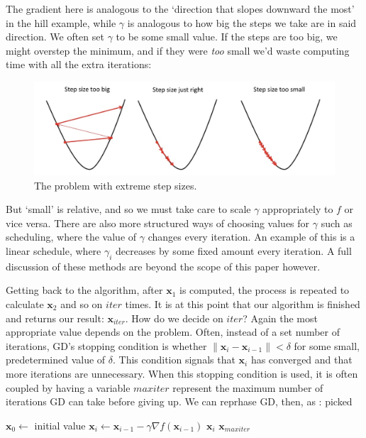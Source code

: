\documentclass{article}
\renewcommand\vec{\mathbf}
\begin{document}
  The gradient here is analogous to the `direction that slopes downward the most' in the hill example, while $\gamma$ is analogous to how big the steps we take are in said direction. We often set $\gamma$ to be some small value. If the steps are too big, we might overstep the minimum, and if they were \textit{too} small we'd waste computing time with all the extra iterations:

  \begin{figure}[H]
    \centering
    \includegraphics[scale=.3]{stepsize}
    \caption{The problem with extreme step sizes.}
  \end{figure}

  But `small' is relative, and so we must take care to scale $\gamma$ appropriately to $f$ or vice versa. There are also more structured ways of choosing values for $\gamma$ such as scheduling, where the value of $\gamma$ changes every iteration. An example of this is a linear schedule, where $\gamma_i$ decreases by some fixed amount every iteration. A full discussion of these methods are beyond the scope of this paper however.

  Getting back to the algorithm, after $\vec x_1$ is computed, the process is repeated to calculate $\vec x_2$ and so on $iter$ times. It is at this point that our algorithm is finished and returns our result: $\vec x_{iter}$. How do we decide on $iter$? Again the most appropriate value depends on the problem. Often, instead of a set number of iterations, GD's stopping condition is whether $\|\vec x_i-\vec x_{i-1}\|<\delta$ for some small, predetermined value of $\delta$. This condition signals that $\vec x_i$ has converged and that more iterations are unnecessary. When this stopping condition is used, it is often coupled by having a variable $maxiter$ represent the maximum number of iterations GD can take before giving up. We can reprhase GD, then, as \cite{2016arXiv160904747R}:
  \vspace{5mm}picked

  \begin{algorithmic}
    \State $\vec x_0\gets$ initial value
      \State $\vec x_i\gets\vec x_{i-1} - \gamma\nabla f(\vec x_{i-1})$
      \If{$||\vec x_i-\vec x_{i-1}\|<\delta$}
        \State \Return $\vec x_i$
      \EndIf
    \EndFor
    \State \Return $\vec x_{maxiter}$
  \EndFunction
  \end{algorithmic}
\end{document}
